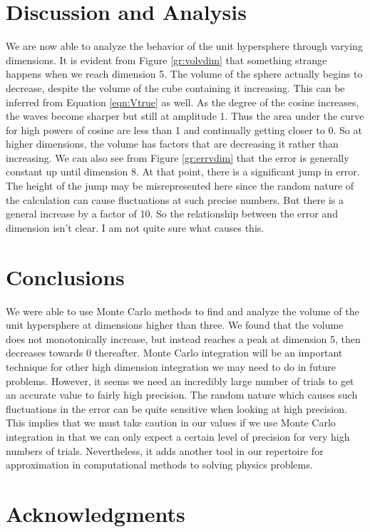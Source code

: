 \documentclass[aps,prl,twocolumn,superscriptaddress]{revtex4-1}
\begin{document}
\section{Discussion and Analysis}
We are now able to analyze the behavior of the unit hypersphere through varying dimensions. It is evident from Figure \ref{gr:volvdim} that something strange happens when we reach dimension 5. The volume of the sphere actually begins to decrease, despite the volume of the cube containing it increasing. This can be inferred from Equation \ref{eqn:Vtrue} as well. As the degree of the cosine increases, the waves become sharper but still at amplitude 1. Thus the area under the curve for high powers of cosine are less than 1 and continually getting closer to 0. So at higher dimensions, the volume has factors that are decreasing it rather than increasing.
We can also see from Figure \ref{gr:errvdim} that the error is generally constant up until dimension 8. At that point, there is a significant jump in error. The height of the jump may be misrepresented here since the random nature of the calculation can cause fluctuations at such precise numbers. But there is a general increase by a factor of 10. So the relationship between the error and dimension isn't clear. I am not quite sure what causes this.

\section{Conclusions}
We were able to use Monte Carlo methods to find and analyze the volume of the unit hypersphere at dimensions higher than three. We found that the volume does not monotonically increase, but instead reaches a peak at dimension 5, then decreases towards 0 thereafter. Monte Carlo integration will be an important technique for other high dimension integration we may need to do in future problems. However, it seems we need an incredibly large number of trials to get an accurate value to fairly high precision. The random nature which causes such fluctuations in the error can be quite sensitive when looking at high precision. This implies that we must take caution in our values if we use Monte Carlo integration in that we can only expect a certain level of precision for very high numbers of trials. Nevertheless, it adds another tool in our repertoire for approximation in computational methods to solving physics problems. 

\section*{Acknowledgments}
\setlength{\parindent}{0cm}



\end{document}

